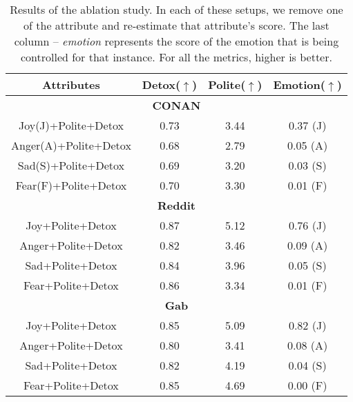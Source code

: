 \begin{table}[h!]
\centering
\begin{tabular}{|c|c|c|c|}
\hline
\textbf{Attributes}          & \textbf{Detox}($\uparrow$)          & \textbf{Polite}($\uparrow$)     & \textbf{Emotion}($\uparrow$) \\ \hline
\multicolumn{4}{|c|}{\textbf{CONAN}}                                   \\ \hline
Joy(J)+Polite+Detox    &    0.73             &  3.44               & 0.37 (J)        \\ \hline
Anger(A)+Polite+Detox  &    0.68             &  2.79               & 0.05 (A)       \\ \hline
Sad(S)+Polite+Detox   &     0.69             &  3.20               & 0.03 (S)        \\ \hline
Fear(F)+Polite+Detox  &     0.70             &  3.30               & 0.01 (F)        \\ \hline

\multicolumn{4}{|c|}{\textbf{Reddit}}                                   \\ \hline
Joy+Polite+Detox    &  0.87               & 5.12                & 0.76 (J)       \\ \hline
Anger+Polite+Detox  &  0.82               & 3.46                & 0.09 (A)    \\ \hline
Sad+Polite+Detox    &  0.84               & 3.96                & 0.05 (S)       \\ \hline
Fear+Polite+Detox   &  0.86               & 3.34                & 0.01 (F)       \\ \hline
\multicolumn{4}{|c|}{\textbf{Gab}}                                   \\ \hline
Joy+Polite+Detox    & 0.85                & 5.09                & 0.82 (J) \\ \hline
Anger+Polite+Detox  & 0.80                & 3.41                & 0.08 (A)  \\ \hline
Sad+Polite+Detox    & 0.82                & 4.19                & 0.04 (S) \\ \hline
Fear+Polite+Detox   & 0.85                & 4.69                & 0.00 (F)\\ \hline
\end{tabular}
\caption{\footnotesize{Results of the ablation study. In each of these setups, we remove one of the attribute and re-estimate that attribute's score. The last column -- \textit{emotion} represents the score of the emotion that is being controlled for that instance. For all the metrics, higher is better.}}
\label{tab:multi-attribute-ablation}
\end{table}
\fi

